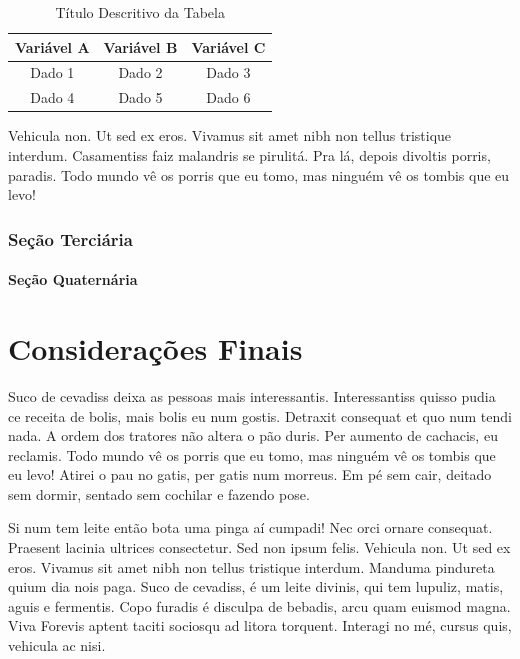 \documentclass[12pt,article,oneside,a4paper,english,brazil]{abntex2}
\begin{document}
\begin{table}[htb]
    \centering
    \caption{Título Descritivo da Tabela}
    \label{tab:exemplo_tabela}
    \begin{tabular}{ccc}
        \toprule
        \textbf{Variável A} & \textbf{Variável B} & \textbf{Variável C} \\
        \midrule
        Dado 1         & Dado 2         & Dado 3         \\
        Dado 4         & Dado 5         & Dado 6         \\
        \bottomrule
    \end{tabular}
\end{table}

Vehicula non. Ut sed ex eros. Vivamus sit amet nibh non tellus tristique interdum. Casamentiss faiz malandris se pirulitá. Pra lá, depois divoltis porris, paradis. Todo mundo vê os porris que eu tomo, mas ninguém vê os tombis que eu levo!

\subsubsection{Seção Terciária}
\paragraph{Seção Quaternária}

\section{Considerações Finais}
Suco de cevadiss deixa as pessoas mais interessantis. Interessantiss quisso pudia ce receita de bolis, mais bolis eu num gostis. Detraxit consequat et quo num tendi nada. A ordem dos tratores não altera o pão duris. Per aumento de cachacis, eu reclamis. Todo mundo vê os porris que eu tomo, mas ninguém vê os tombis que eu levo! Atirei o pau no gatis, per gatis num morreus. Em pé sem cair, deitado sem dormir, sentado sem cochilar e fazendo pose.

Si num tem leite então bota uma pinga aí cumpadi! Nec orci ornare consequat. Praesent lacinia ultrices consectetur. Sed non ipsum felis. Vehicula non. Ut sed ex eros. Vivamus sit amet nibh non tellus tristique interdum. Manduma pindureta quium dia nois paga. Suco de cevadiss, é um leite divinis, qui tem lupuliz, matis, aguis e fermentis. Copo furadis é disculpa de bebadis, arcu quam euismod magna. Viva Forevis aptent taciti sociosqu ad litora torquent. Interagi no mé, cursus quis, vehicula ac nisi.
\end{document}

